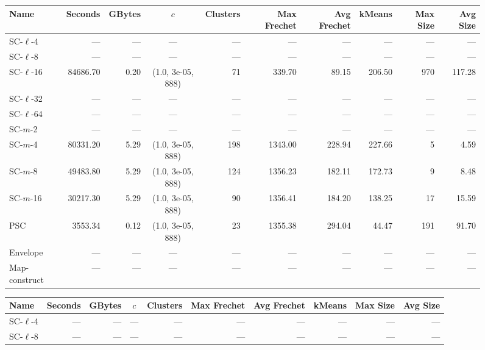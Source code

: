 \documentclass[11pt]{article}
\begin{document}
\begin{figure} \begin{center}
    \begin{minipage}{\textwidth}
    {
    \begin{tabular}{@{}lrrcrrrrrr@{}}
        \toprule
        Name & Seconds & GBytes & $c$ & Clusters & Max Frechet & Avg Frechet & kMeans & Max Size & Avg Size\\
        \midrule
        SC-$\ell$-4 & --- & --- & --- & --- & --- & --- & --- & --- & ---\\
        SC-$\ell$-8 & --- & --- & --- & --- & --- & --- & --- & --- & ---\\
        SC-$\ell$-16 & 84686.70 & 0.20 & (1.0, 3e-05, 888) & 71 & 339.70 & 89.15 & 206.50 & 970 & 117.28\\
        SC-$\ell$-32 & --- & --- & --- & --- & --- & --- & --- & --- & ---\\
        SC-$\ell$-64 & --- & --- & --- & --- & --- & --- & --- & --- & ---\\
        SC-$m$-2 & --- & --- & --- & --- & --- & --- & --- & --- & ---\\
        SC-$m$-4 & 80331.20 & 5.29 & (1.0, 3e-05, 888) & 198 & 1343.00 & 228.94 & 227.66 & 5 & 4.59\\
        SC-$m$-8 & 49483.80 & 5.29 & (1.0, 3e-05, 888) & 124 & 1356.23 & 182.11 & 172.73 & 9 & 8.48\\
        SC-$m$-16 & 30217.30 & 5.29 & (1.0, 3e-05, 888) & 90 & 1356.41 & 184.20 & 138.25 & 17 & 15.59\\
        PSC & 3553.34 & 0.12 & (1.0, 3e-05, 888) & 23 & 1355.38 & 294.04 & 44.47 & 191 & 91.70\\
        Envelope & --- & --- & --- & --- & --- & --- & --- & --- & ---\\
        Map-construct & --- & --- & --- & --- & --- & --- & --- & --- & ---\\
        \bottomrule
    \end{tabular}
    }
    {
    \begin{tabular}{@{}lrrcrrrrrr@{}}
        \toprule
        Name & Seconds & GBytes & $c$ & Clusters & Max Frechet & Avg Frechet & kMeans & Max Size & Avg Size\\
        \midrule
        SC-$\ell$-4 & --- & --- & --- & --- & --- & --- & --- & --- & ---\\
        SC-$\ell$-8 & --- & --- & --- & --- & --- & --- & --- & --- & ---\\

\end{tabular}}
\end{minipage}
\end{center}
\end{figure}
\end{document}
